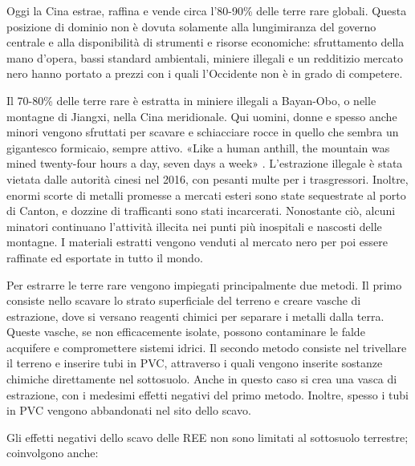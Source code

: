 \documentclass[12pt,a4paper,oneside]{book}
\begin{document}
Oggi la Cina estrae, raffina e vende circa l'80-90\% delle terre rare globali. Questa posizione di dominio non è dovuta solamente alla lungimiranza del governo centrale e alla disponibilità di strumenti e risorse economiche: sfruttamento della mano d'opera, bassi standard ambientali, miniere illegali e un redditizio mercato nero hanno portato a prezzi con i quali l'Occidente non è in grado di competere.

Il 70-80\% delle terre rare è estratta in miniere illegali a Bayan-Obo, o nelle montagne di Jiangxi, nella Cina meridionale. Qui uomini, donne e spesso anche minori vengono sfruttati per scavare e schiacciare rocce in quello che sembra un gigantesco formicaio, sempre attivo. «Like a human anthill, the mountain was mined twenty-four hours a day, seven days a week» \citep[p. 24]{pitron2020rare}.
L'estrazione illegale è stata vietata dalle autorità cinesi nel 2016, con pesanti multe per i trasgressori. Inoltre, enormi scorte di metalli promesse a mercati esteri sono state sequestrate al porto di Canton, e dozzine di trafficanti sono stati incarcerati.
Nonostante ciò, alcuni minatori continuano l'attività illecita nei punti più inospitali e nascosti delle montagne. I materiali estratti vengono venduti al mercato nero per poi essere raffinate ed esportate in tutto il mondo.

Per estrarre le terre rare vengono impiegati principalmente due metodi. Il primo consiste nello scavare lo strato superficiale del terreno e creare vasche di estrazione, dove si versano reagenti chimici per separare i metalli dalla terra. Queste vasche, se non efficacemente isolate, possono contaminare le falde acquifere e compromettere sistemi idrici.
Il secondo metodo consiste nel trivellare il terreno e inserire tubi in PVC, attraverso i quali vengono inserite sostanze chimiche direttamente nel sottosuolo. Anche in questo caso si crea una vasca di estrazione, con i medesimi effetti negativi del primo metodo. Inoltre, spesso i tubi in PVC vengono abbandonati nel sito dello scavo.

Gli effetti negativi dello scavo delle REE non sono limitati al sottosuolo terrestre; coinvolgono anche:
\end{document}
